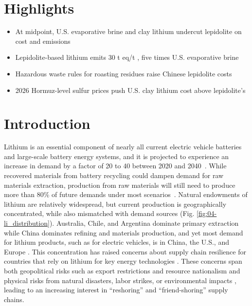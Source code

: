 \documentclass{article}
\renewcommand\_{\textunderscore\allowbreak}
\begin{document}
\section*{Highlights}
\begin{itemize}
    \item At midpoint, U.S. evaporative brine and clay lithium undercut lepidolite on cost and emissions
    \item Lepidolite-based lithium emits 30 t eq/t , five times U.S. evaporative brine
    \item Hazardous waste rules for roasting residues raise Chinese lepidolite costs
    \item 2026 Hormuz-level sulfur prices push U.S. clay lithium cost above lepidolite's
\end{itemize}


\clearpage
\section{Introduction}

Lithium is an essential component of nearly all current electric vehicle batteries and large-scale battery energy systems, and it is projected to experience an increase in demand by a factor of 20 to 40 between 2020 and 2040~\cite{internationalenergyagencyGlobalCriticalMinerals2024, xuFutureMaterialDemand2020, greimAssessmentLithiumCriticality2020}. While recovered materials from battery recycling could dampen demand for raw materials extraction, production from raw materials will still need to produce more than 80\% of future demands under most scenarios~\cite{xuFutureMaterialDemand2020}. Natural endowments of lithium are relatively widespread, but current production is geographically concentrated, while also mismatched with demand sources (Fig. \ref{fig:04-li_distribution}). Australia, Chile, and Argentina dominate primary extraction while China dominates refining and materials production, and yet most demand for lithium products, such as for electric vehicles, is in China, the U.S., and Europe \cite{chengElectricVehicleBattery2024, greitemeierChinasHoldLithiumion2025}. This concentration has raised concerns about supply chain resilience for countries that rely on lithium for key energy technologies \cite{internationalenergyagencyGlobalCriticalMinerals2024, olivettiLithiumIonBatterySupply2017, chengElectricVehicleBattery2024}. These concerns span both geopolitical risks such as export restrictions and resource nationalism \cite{bremmerRiseFallResource2009, prinaceraiGeographyControlDeep2024} and physical risks from natural disasters, labor strikes, or environmental impacts \cite{helbigSupplyRisksAssociated2018, schrijversReviewMethodsData2020}, leading to an increasing interest in ``reshoring'' and ``friend-shoring'' supply chains. 
\end{document}
